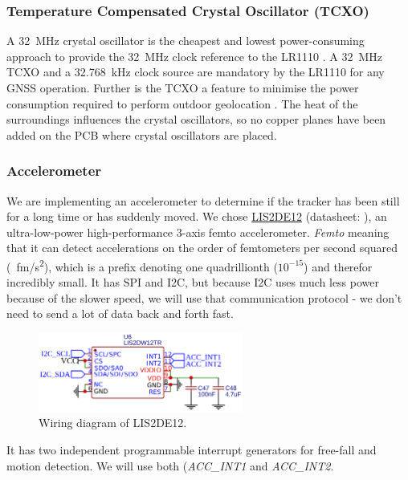 \subsubsection{Temperature Compensated Crystal Oscillator (TCXO)}
A \SI{32}{\mega\hertz} crystal oscillator is the cheapest and lowest power-consuming approach to provide the \SI{32}{\mega\hertz} clock reference to the LR1110 \cite[p.~50]{LR1110_user_manual}.
A \SI{32}{\mega\hertz} \ac{TCXO} and a \SI{32.768}{\kilo\hertz} clock source are mandatory by the LR1110 for any \ac{GNSS} operation. Further is the \ac{TCXO} a feature to minimise the power consumption required to perform outdoor geolocation \cite[p.~51, p.~132]{LR1110_user_manual}. The heat of the surroundings influences the crystal oscillators, so no copper planes have been added on the \ac{PCB} where crystal oscillators are placed. %

\subsubsection{Accelerometer}
We are implementing an accelerometer to determine if the tracker has been still for a long time or has suddenly moved. We chose \hyperref[bom:lis2de12]{LIS2DE12} (datasheet: ), an ultra-low-power high-performance 3-axis femto accelerometer. \textit{Femto} meaning that it can detect accelerations on the order of femtometers per second squared (\SI{}{\femto\meter/\second^2}), which is a prefix denoting one quadrillionth ($10^{-15}$) and therefor incredibly small. It has \ac{SPI} and \ac{I2C}, but because \ac{I2C} uses much less power because of the slower speed, we will use that communication protocol - we don't need to send a lot of data back and forth fast.

\begin{figure}[H]
    \centering
    \includegraphics[width=0.6\textwidth]{figures/LIS2DE12.png}
    \caption{Wiring diagram of LIS2DE12.}
    \label{fig:schematic:lis2de12}
\end{figure}

It has two independent programmable interrupt generators for free-fall and motion detection. We will use both (\textit{ACC\_INT1} and \textit{ACC\_INT2}.


